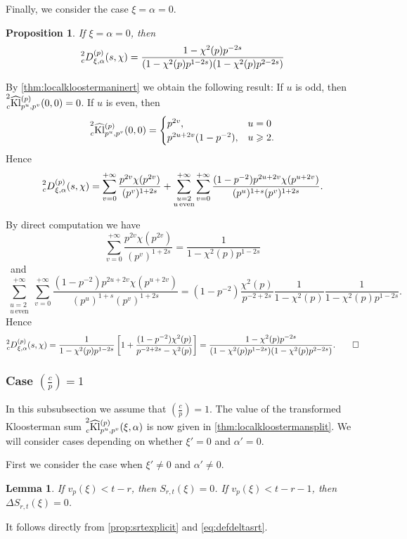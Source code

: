 \documentclass[10pt,oneside,reqno]{amsart}
\makeatletter
\newcommand\Kl{\mathrm{Kl}}
\renewcommand\geq{\geqslant}
\newcommand\legendresymbol[2]{\genfrac{(}{)}{}{}{#1}{#2}}
\theoremstyle{THEOREM}
\newtheorem{lemma}[theorem]{Lemma}
\newtheorem{proposition}[theorem]{Proposition}
\theoremstyle{DEFINITION}
\theoremstyle{EXERCISE}
\numberwithin{equation}{section}
\renewenvironment{proof}[1][\proofname]{\par
  \vspace{-6pt}
  \pushQED{\qed}
  \normalfont \topsep6\p@\@plus6\p@\relax
  \trivlist
  \item[\hskip\labelsep\rmfamily\bfseries
    #1\@addpunct{:}]\ignorespaces
}{
  \popQED\endtrivlist\@endpefalse
  \vspace{-6pt}
}
\makeatother
\begin{document}
Finally, we consider the case $\xi=\alpha=0$.
\begin{proposition}\label{prop:zeroinert}
If $\xi=\alpha=0$, then
\[
\prescript{2}{c}D_{\xi,\alpha}^{(p)}(s,\chi)=\frac{1-\chi^2(p)p^{-2s}}{(1-\chi^2(p)p^{1-2s}) (1-\chi^2(p)p^{2-2s})}
\]
\end{proposition}
\begin{proof}
By \autoref{thm:localkloostermaninert} we obtain the following result: If $u$ is odd, then    $\prescript{2}{c}{\widehat{\Kl}}_{p^u,p^v}^{(p)}(0,0)=0$. If $u$ is even, then
\[
\prescript{2}{c}{\widehat{\Kl}}_{p^u,p^v}^{(p)}(0,0)=\begin{cases}
                                                      p^{2v}, & u=0 \\
                                                      p^{2u+2v}(1-p^{-2}), & u\geq 2.
                                                    \end{cases}
\]
Hence
\[
\prescript{2}{c}D_{\xi,\alpha}^{(p)}(s,\chi)=\sum_{v=0}^{+\infty}\frac{p^{2v}\chi(p^{2v})} {(p^v)^{1+2s}}+\sum_{\substack{u=2\\ u\,\text{even}}}^{+\infty}\sum_{v=0}^{+\infty}\frac{(1-p^{-2})p^{2u+2v}\chi(p^{u+2v})} {(p^u)^{1+s}(p^v)^{1+2s}}.
\]

By direct computation we have
\[
\sum_{v=0}^{+\infty}\frac{p^{2v}\chi(p^{2v})} {(p^v)^{1+2s}}=\frac{1}{1-\chi^2(p)p^{1-2s}}
\]\
and
\[
\sum_{\substack{u=2\\ u\,\text{even}}}^{+\infty}\sum_{v=0}^{+\infty}\frac{(1-p^{-2})p^{2u+2v}\chi(p^{u+2v})} {(p^u)^{1+s}(p^v)^{1+2s}}=(1-p^{-2})\frac{\chi^2(p)}{p^{-2+2s}}\frac{1}{1-\chi^2(p)} \frac{1}{1-\chi^2(p)p^{1-2s}}.
\]
Hence
\[
\prescript{2}{c}D_{\xi,\alpha}^{(p)}(s,\chi)=\frac{1}{1-\chi^2(p)p^{1-2s}}\left[1+ \frac{(1-p^{-2})\chi^2(p)}{p^{-2+2s}-\chi^2(p)}\right]=\frac{1-\chi^2(p)p^{-2s}}{(1-\chi^2(p)p^{1-2s}) (1-\chi^2(p)p^{2-2s})}.\qedhere
\]
\end{proof}

\subsubsection{Case $\legendresymbol{c}{p}=1$}
In this subsubsection we assume that $\legendresymbol{c}{p}=1$. The value of the transformed Kloosterman sum $\prescript{2}{c}{\widehat{\Kl}}_{p^u,p^v}^{(p)}(\xi,\alpha)$ is now given in \autoref{thm:localkloostermansplit}.  We will consider cases depending on whether $\xi'=0$ and $\alpha'=0$.

First we consider the case when $\xi'\neq 0$ and $\alpha'\neq 0$.
\begin{lemma}\label{lem:srtzero}
If $v_p(\xi)<t-r$, then $S_{r,t}(\xi)=0$. If $v_p(\xi)<t-r-1$, then $\Delta S_{r,t}(\xi)=0$. 
\end{lemma}
\begin{proof}
It follows directly from \autoref{prop:srtexplicit} and \eqref{eq:defdeltasrt}.
\end{proof}
\end{document}
